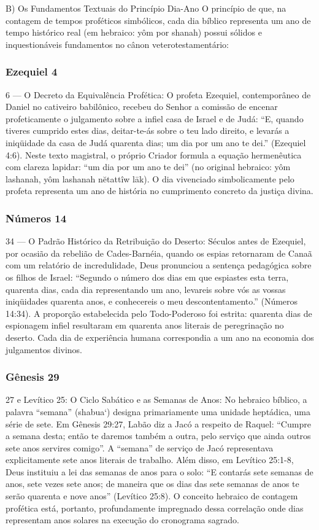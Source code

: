 \documentclass[11pt,a4paper,openany]{book}
\begin{document}
B) Os Fundamentos Textuais do Princípio Dia-Ano
O princípio de que, na contagem de tempos proféticos simbólicos, cada dia bíblico representa um ano de tempo histórico real (em hebraico: yôm por shanah) possui sólidos e inquestionáveis fundamentos no cânon veterotestamentário:


\subsubsection*{Ezequiel 4}
6 — O Decreto da Equivalência Profética:
O profeta Ezequiel, contemporâneo de Daniel no cativeiro babilônico, recebeu do Senhor a comissão de encenar profeticamente o julgamento sobre a infiel casa de Israel e de Judá:
``E, quando tiveres cumprido estes dias, deitar-te-ás sobre o teu lado direito, e levarás a iniqüidade da casa de Judá quarenta dias; um dia por um ano te dei.'' (Ezequiel 4:6).
Neste texto magistral, o próprio Criador formula a equação hermenêutica com clareza lapidar: ``um dia por um ano te dei'' (no original hebraico: yôm lashanah, yôm lashanah nĕtattîw lāk). O dia vivenciado simbolicamente pelo profeta representa um ano de história no cumprimento concreto da justiça divina.


\subsubsection*{Números 14}
34 — O Padrão Histórico da Retribuição do Deserto:
Séculos antes de Ezequiel, por ocasião da rebelião de Cades-Barnéia, quando os espias retornaram de Canaã com um relatório de incredulidade, Deus pronunciou a sentença pedagógica sobre os filhos de Israel:
``Segundo o número dos dias em que espiastes esta terra, quarenta dias, cada dia representando um ano, levareis sobre vós as vossas iniqüidades quarenta anos, e conhecereis o meu descontentamento.'' (Números 14:34).
A proporção estabelecida pelo Todo-Poderoso foi estrita: quarenta dias de espionagem infiel resultaram em quarenta anos literais de peregrinação no deserto. Cada dia de experiência humana correspondia a um ano na economia dos julgamentos divinos.


\subsubsection*{Gênesis 29}
27 e Levítico 25: O Ciclo Sabático e as Semanas de Anos:
No hebraico bíblico, a palavra ``semana'' (shabua‘) designa primariamente uma unidade heptádica, uma série de sete. Em Gênesis 29:27, Labão diz a Jacó a respeito de Raquel: ``Cumpre a semana desta; então te daremos também a outra, pelo serviço que ainda outros sete anos servires comigo''. A ``semana'' de serviço de Jacó representava explicitamente sete anos literais de trabalho.
Além disso, em Levítico 25:1-8, Deus instituiu a lei das semanas de anos para o solo: ``E contarás sete semanas de anos, sete vezes sete anos; de maneira que os dias das sete semanas de anos te serão quarenta e nove anos'' (Levítico 25:8). O conceito hebraico de contagem profética está, portanto, profundamente impregnado dessa correlação onde dias representam anos solares na execução do cronograma sagrado.
\end{document}
